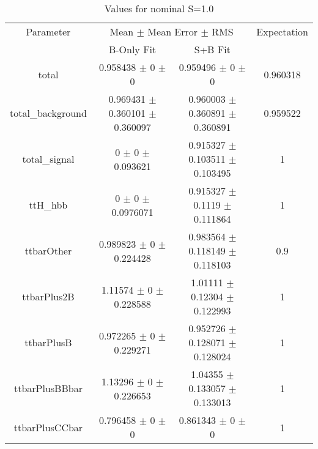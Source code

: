 \begin{table}
\centering
\caption{Values for nominal S=1.0}
\begin{tabular}{cccc}
\toprule
Parameter & \multicolumn{2}{c}{Mean $\pm$ Mean Error $\pm$ RMS} & Expectation\\
 & B-Only Fit & S+B Fit & \\
\midrule
total & \num{0.958438} $\pm$ \num{0} $\pm$ \num{0} & \num{0.959496} $\pm$ \num{0} $\pm$ \num{0} & \num{0.960318}\\
total\_background & \num{0.969431} $\pm$ \num{0.360101} $\pm$ \num{0.360097} & \num{0.960003} $\pm$ \num{0.360891} $\pm$ \num{0.360891} & \num{0.959522}\\
total\_signal & \num{0} $\pm$ \num{0} $\pm$ \num{0.093621} & \num{0.915327} $\pm$ \num{0.103511} $\pm$ \num{0.103495} & \num{1}\\
ttH\_hbb & \num{0} $\pm$ \num{0} $\pm$ \num{0.0976071} & \num{0.915327} $\pm$ \num{0.1119} $\pm$ \num{0.111864} & \num{1}\\
ttbarOther & \num{0.989823} $\pm$ \num{0} $\pm$ \num{0.224428} & \num{0.983564} $\pm$ \num{0.118149} $\pm$ \num{0.118103} & \num{0.9}\\
ttbarPlus2B & \num{1.11574} $\pm$ \num{0} $\pm$ \num{0.228588} & \num{1.01111} $\pm$ \num{0.12304} $\pm$ \num{0.122993} & \num{1}\\
ttbarPlusB & \num{0.972265} $\pm$ \num{0} $\pm$ \num{0.229271} & \num{0.952726} $\pm$ \num{0.128071} $\pm$ \num{0.128024} & \num{1}\\
ttbarPlusBBbar & \num{1.13296} $\pm$ \num{0} $\pm$ \num{0.226653} & \num{1.04355} $\pm$ \num{0.133057} $\pm$ \num{0.133013} & \num{1}\\
ttbarPlusCCbar & \num{0.796458} $\pm$ \num{0} $\pm$ \num{0} & \num{0.861343} $\pm$ \num{0} $\pm$ \num{0} & \num{1}\\
\bottomrule
\end{tabular}
\end{table}